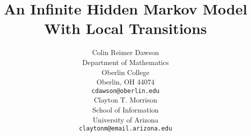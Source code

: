 \documentclass{article} %
\title{An Infinite Hidden Markov Model With Local Transitions}
\author{
Colin Reimer Dawson \\
Department of Mathematics\\
Oberlin College\\
Oberlin, OH 44074 \\
\texttt{cdawson@oberlin.edu} \\
\And
Clayton T. Morrison \\
School of Information \\
University of Arizona \\
\texttt{claytonm@email.arizona.edu}
}
\begin{document}
\maketitle

\begin{abstract}

\end{abstract}

% 





% 



\end{document}
